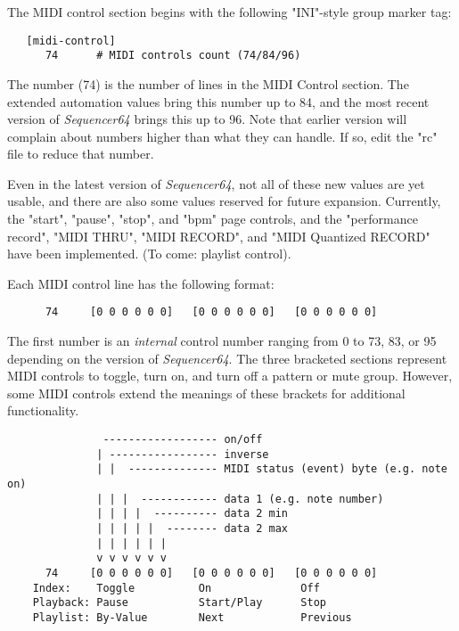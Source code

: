    The MIDI control section begins with the following "INI"-style
   group marker tag:

   \begin{verbatim}
   [midi-control]
      74      # MIDI controls count (74/84/96)
   \end{verbatim}

   The number (74) is the number of lines in the MIDI Control section.  The
   extended automation values bring this number up to 84, and the most recent
   version of \textsl{Sequencer64} brings this up to 96.  Note that earlier
   version will complain about numbers higher than what they can handle.  If
   so, edit the "rc" file to reduce that number.

   Even in the latest version of \textsl{Sequencer64}, 
   not all of these new values are yet usable, and there are also some values
   reserved for future expansion.  Currently, the
   "start", "pause", "stop", and "bpm" page controls, and the "performance
   record", "MIDI THRU", "MIDI RECORD", and "MIDI Quantized RECORD"
   have been implemented.
   (To come:  playlist control).

   Each MIDI control line has the following format:

   \begin{verbatim}
      74     [0 0 0 0 0 0]   [0 0 0 0 0 0]   [0 0 0 0 0 0]
   \end{verbatim}

   The first number is an \textsl{internal} control number ranging from
   0 to 73, 83, or 95 depending on the version of \textsl{Sequencer64}.
   The three bracketed sections represent MIDI controls to
   toggle,
   turn on, and
   turn off a pattern or mute group.
   However, some MIDI controls extend the meanings of these brackets
   for additional functionality.

   \begin{verbatim}
               ------------------ on/off
              | ----------------- inverse
              | |  -------------- MIDI status (event) byte (e.g. note on)
              | | |  ------------ data 1 (e.g. note number)
              | | | |  ---------- data 2 min
              | | | | |  -------- data 2 max
              | | | | | |
              v v v v v v
      74     [0 0 0 0 0 0]   [0 0 0 0 0 0]   [0 0 0 0 0 0]
    Index:    Toggle          On              Off
    Playback: Pause           Start/Play      Stop
    Playlist: By-Value        Next            Previous
   \end{verbatim}

